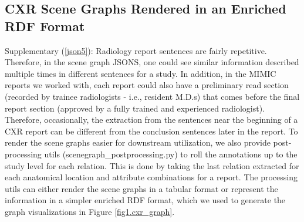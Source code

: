 
\vspace{-5pt}
\subsection*{CXR Scene Graphs Rendered in an Enriched RDF Format}
\vspace{-2pt}
Supplementary (\ref{json5}):
Radiology report sentences are fairly repetitive. Therefore, in the scene graph JSONS, one could see similar information described multiple times in different sentences for a study. In addition, in the MIMIC reports we worked with, each report could also have a preliminary read section (recorded by trainee radiologists - i.e., resident M.D.s) that comes before the final report section (approved by a fully trained and experienced radiologist). Therefore, occasionally, the extraction from the sentences near the beginning of a CXR report can be different from the conclusion sentences later in the report. To render the scene graphs easier for downstream utilization, we also provide post-processing utils (scenegraph\_postprocessing.py) to roll the annotations up to the study level for each relation. This is done by taking the last relation extracted for each anatomical location and attribute combinations for a report. The processing utils can either render the scene graphs in a tabular format or represent the information in a simpler enriched RDF format, which we used to generate the graph visualizations in Figure \ref{fig1.cxr_graph}. 

